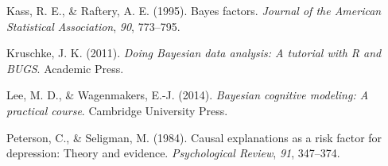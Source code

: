 \documentclass[
  a4paper,
]{book}
\newlength{\cslhangindent}
\newlength{\cslentryspacingunit} %
\newenvironment{CSLReferences}[2] %
 {%
  \setlength{\parindent}{0pt}
  \ifodd #1
  \let\oldpar\par
  \def\par{\hangindent=\cslhangindent\oldpar}
  \fi
  \setlength{\parskip}{#2\cslentryspacingunit}
 }%
 {}
\begin{document}
\begin{CSLReferences}{1}{0}
\leavevmode{}%
Kass, R. E., \& Raftery, A. E. (1995). Bayes factors. \emph{Journal of
the American Statistical Association}, \emph{90}, 773--795.

\leavevmode{}%
Kruschke, J. K. (2011). \emph{Doing {B}ayesian data analysis: A tutorial
with {R} and {BUGS}}. Academic Press.

\leavevmode{}%
Lee, M. D., \& Wagenmakers, E.-J. (2014). \emph{Bayesian cognitive
modeling: A practical course}. Cambridge University Press.

\leavevmode{}%
Peterson, C., \& Seligman, M. (1984). Causal explanations as a risk
factor for depression: Theory and evidence. \emph{Psychological Review},
\emph{91}, 347--374.

\end{CSLReferences}


\backmatter

\printendnotes
\newpage
\printindex

\end{document}
